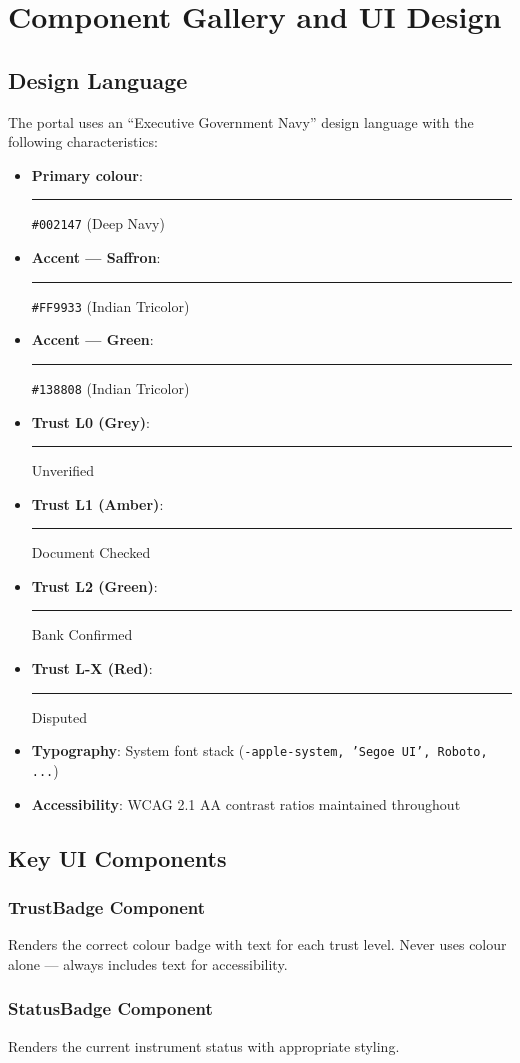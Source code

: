 \documentclass[12pt, a4paper]{report}
\begin{document}
\chapter{Component Gallery and UI Design}

\section{Design Language}

The portal uses an ``Executive Government Navy'' design language with the following characteristics:

\begin{itemize}
  \item \textbf{Primary colour}: \textcolor{aicteNavy}{\rule{1cm}{0.5em}} \texttt{\#002147} (Deep Navy)
  \item \textbf{Accent --- Saffron}: \textcolor{aicteSaffron}{\rule{1cm}{0.5em}} \texttt{\#FF9933} (Indian Tricolor)
  \item \textbf{Accent --- Green}: \textcolor{aicteGreen}{\rule{1cm}{0.5em}} \texttt{\#138808} (Indian Tricolor)
  \item \textbf{Trust L0 (Grey)}: \textcolor{trustL0}{\rule{1cm}{0.5em}} Unverified
  \item \textbf{Trust L1 (Amber)}: \textcolor{trustL1}{\rule{1cm}{0.5em}} Document Checked
  \item \textbf{Trust L2 (Green)}: \textcolor{trustL2}{\rule{1cm}{0.5em}} Bank Confirmed
  \item \textbf{Trust L-X (Red)}: \textcolor{trustLX}{\rule{1cm}{0.5em}} Disputed
  \item \textbf{Typography}: System font stack (\texttt{-apple-system, 'Segoe UI', Roboto, ...})
  \item \textbf{Accessibility}: WCAG 2.1 AA contrast ratios maintained throughout
\end{itemize}

\section{Key UI Components}

\subsection{TrustBadge Component}
Renders the correct colour badge with text for each trust level. Never uses colour alone --- always includes text for accessibility.

\subsection{StatusBadge Component}
Renders the current instrument status with appropriate styling.
\end{document}

